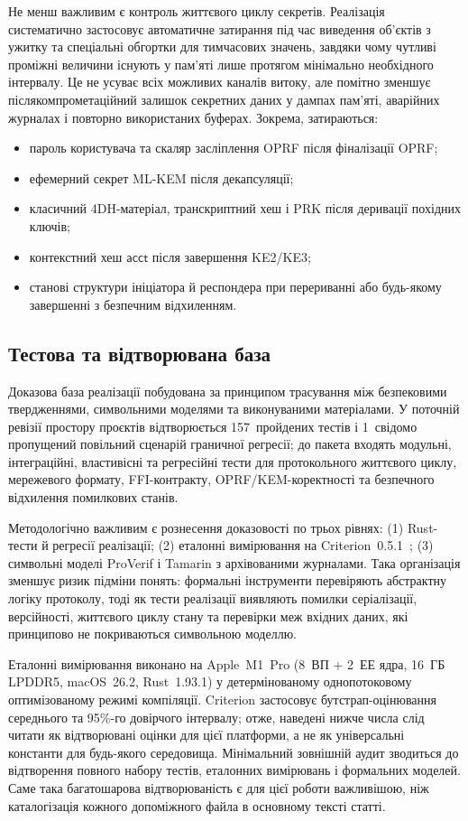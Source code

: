 \documentclass{llncs}
\newcommand{\acct}{\mathsf{acct}}
\begin{document}
Не менш важливим є контроль життєвого циклу секретів. Реалізація
систематично застосовує автоматичне затирання під час виведення
об'єктів з ужитку та спеціальні обгортки для тимчасових значень,
завдяки чому чутливі проміжні величини існують у пам'яті лише протягом
мінімально необхідного інтервалу. Це не усуває всіх можливих каналів
витоку, але помітно зменшує післякомпрометаційний залишок секретних
даних у дампах пам'яті, аварійних журналах і повторно використаних
буферах. Зокрема, затираються:
\begin{itemize}
  \item пароль користувача та скаляр засліплення OPRF після фіналізації
        OPRF;
  \item ефемерний секрет ML-KEM після декапсуляції;
  \item класичний 4DH-матеріал, транскриптний хеш і PRK після деривації
        похідних ключів;
  \item контекстний хеш $\acct$ після завершення KE2/KE3;
  \item станові структури ініціатора й респондера при перериванні
        або будь-якому завершенні з безпечним відхиленням.
\end{itemize}

\subsection{Тестова та відтворювана база}

Доказова база реалізації побудована за принципом трасування між
безпековими твердженнями, символьними моделями та виконуваними
матеріалами. У поточній ревізії простору проєктів відтворюється
157~пройдених тестів і 1~свідомо пропущений повільний сценарій
граничної регресії; до пакета входять модульні, інтеграційні,
властивісні та регресійні тести для протокольного життєвого циклу,
мережевого формату, FFI-контракту, OPRF/KEM-коректності та безпечного
відхилення помилкових станів.

Методологічно важливим є рознесення доказовості по трьох рівнях:
(1) Rust-тести й регресії реалізації; (2) еталонні вимірювання на
Criterion~0.5.1~\cite{heyer2023}; (3) символьні моделі ProVerif і
Tamarin з архівованими журналами. Така організація зменшує ризик
підміни понять: формальні інструменти перевіряють абстрактну логіку
протоколу, тоді як тести реалізації виявляють помилки серіалізації,
версійності, життєвого циклу стану та перевірки меж вхідних даних, які
принципово не покриваються символьною моделлю.

Еталонні вимірювання виконано на Apple~M1~Pro (8~ВП + 2~ЕЕ ядра,
16~ГБ LPDDR5, macOS~26.2, Rust~1.93.1) у детермінованому однопотоковому
оптимізованому режимі компіляції. Criterion застосовує бутстрап-оцінювання
середнього та 95\%-го довірчого інтервалу; отже, наведені нижче числа
слід читати як відтворювані оцінки для цієї платформи, а не як
універсальні константи для будь-якого середовища. Мінімальний зовнішній
аудит зводиться до відтворення повного набору тестів, еталонних
вимірювань і формальних моделей. Саме така багатошарова відтворюваність
є для цієї
роботи важливішою, ніж каталогізація кожного допоміжного файла в
основному тексті статті.
\end{document}

